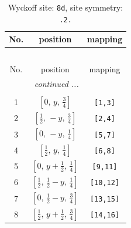 \documentclass[fleqn,8pt]{jsarticle}
\begin{document}
\begin{longtable}{ccc}
\caption{Wyckoff site: {\tt 8d}, site symmetry: {\tt .2.}}
 \\
 \hline \hline
No. & position & mapping \\ \hline \endfirsthead

\multicolumn{2}{l}{\tablename\ \thetable{}} \\
 \hline \hline
No. & position & mapping \\ \hline \endhead

 \hline \hline
\multicolumn{2}{r}{\footnotesize\it continued ...} \\ \endfoot

 \hline \hline
\multicolumn{2}{r}{} \\ \endlastfoot

1 & $\left[ 0,\, y,\, \frac{3}{4} \right]$ & {\tt [1,3]} \\ \hline
2 & $\left[ \frac{1}{2},\, - y,\, \frac{3}{4} \right]$ & {\tt [2,4]} \\ \hline
3 & $\left[ 0,\, - y,\, \frac{1}{4} \right]$ & {\tt [5,7]} \\ \hline
4 & $\left[ \frac{1}{2},\, y,\, \frac{1}{4} \right]$ & {\tt [6,8]} \\ \hline
5 & $\left[ 0,\, y + \frac{1}{2},\, \frac{1}{4} \right]$ & {\tt [9,11]} \\ \hline
6 & $\left[ \frac{1}{2},\, \frac{1}{2} - y,\, \frac{1}{4} \right]$ & {\tt [10,12]} \\ \hline
7 & $\left[ 0,\, \frac{1}{2} - y,\, \frac{3}{4} \right]$ & {\tt [13,15]} \\ \hline
8 & $\left[ \frac{1}{2},\, y + \frac{1}{2},\, \frac{3}{4} \right]$ & {\tt [14,16]} \\
\end{longtable}
\renewcommand{\arraystretch}{1.2}
\end{document}
